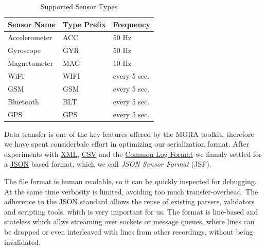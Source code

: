 \documentclass[times, 10pt,twocolumn]{article}
\begin{document}
\begin{table}
\begin{center}
\begin{tabular}{lll}
Sensor Name   & Type Prefix  & Frequency \\ \hline
Accelerometer & ACC          & 50 Hz  \\
Gyroscope     & GYR          & 50 Hz  \\
Magnetometer  & MAG          & 10 Hz  \\
WiFi          & WIFI         & every 5 sec. \\
GSM           & GSM          & every 5 sec.  \\
Bluetooth     & BLT          & every 5 sec.  \\
GPS           & GPS          & every 5 sec.
\end{tabular}
\end{center}
\caption{Supported Sensor Types}
\label{fig:sensors}
\end{table}



\label{sec:jsf}

Data transfer is one of the key features offered by the MORA toolkit, therefore we have spent considerbale effort in optimizing our serialization format.
After experiments with \href{http://www.w3.org/XML/}{XML}, \href{http://tools.ietf.org/html/rfc4180}{CSV} and the \href{http://en.wikipedia.org/wiki/Common_Log_Format}{Common Log Format} we finnaly settled for a \href{http://www.ietf.org/rfc/rfc4627.txt}{JSON} based format, which we call {\em JSON Sensor Format} (JSF).

The file format is human readable, so it can be quickly inspected for debugging. At the same time verbosity is limited, avoiding too much transfer-overhead.
The adherence to the JSON standard allows the reuse of existing parsers, validators and scripting tools, which is very important for us.
The format is line-based and stateless which allws streaming over sockets or message queues, where lines can be dropped or even interleaved with lines from other recordings, without being invalidated.
\end{document}
